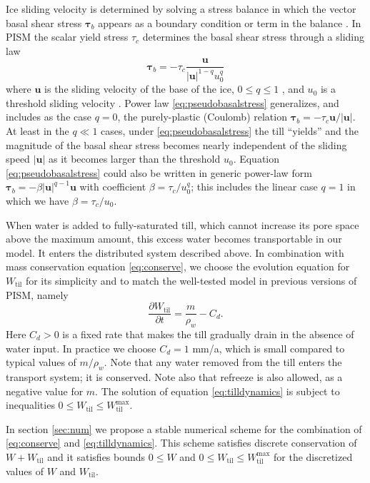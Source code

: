 \documentclass[gmd]{copernicus}   %
\newcommand{\text}{\textrm}
\newcommand{\Wtil}{W_{\text{til}}}
\newcommand{\Wtilmax}{W_{\text{til}}^{\text{max}}}
\begin{document}
Ice sliding velocity is determined by solving a stress balance in which the vector basal shear stress $\boldsymbol\tau_b$ appears as a boundary condition or term in the balance \citep{BBssasliding,SchoofStream,SchoofCoulombBlatter}.  In PISM the scalar yield stress $\tau_c$ determines the basal shear stress through a sliding law
\begin{equation}
\boldsymbol\tau_b = - \tau_c \frac{\mathbf{u}}{|\mathbf{u}|^{1-q} u_0^q} \label{eq:pseudobasalstress}
\end{equation}
where $\mathbf{u}$ is the sliding velocity of the base of the ice, $0\le q \le 1$ , and $u_0$ is a threshold sliding velocity \citep{AschwandenAdalgeirsdottirKhroulev}.  Power law \eqref{eq:pseudobasalstress} generalizes, and includes as the case $q=0$, the purely-plastic (Coulomb) relation $\boldsymbol\tau_b = - \tau_c \mathbf{u}/|\mathbf{u}|$.  At least in the $q\ll 1$ cases, under \eqref{eq:pseudobasalstress} the till ``yields'' and the magnitude of the basal shear stress becomes nearly independent of the sliding speed $|\mathbf{u}|$ as it becomes larger than the threshold $u_0$.  Equation \eqref{eq:pseudobasalstress} could also be written in generic power-law form $\boldsymbol\tau_b = - \beta |\mathbf{u}|^{q-1} \mathbf{u}$ with coefficient $\beta = \tau_c / u_0^q$; this includes the linear case $q=1$ in which we have $\beta = \tau_c/u_0$.

When water is added to fully-saturated till, which cannot increase its pore space above the maximum amount, this excess water becomes transportable in our model.  It enters the distributed system described above.  In combination with mass conservation equation \eqref{eq:conserve}, we choose the evolution equation for $\Wtil$ for  its simplicity and to match the well-tested model in previous versions of PISM, namely
\begin{equation}
\frac{\partial \Wtil}{\partial t} = \frac{m}{\rho_w} - C_d. \label{eq:tilldynamics}
\end{equation}
Here $C_d>0$ is a fixed rate that makes the till gradually drain in the absence of water input.  In practice we choose $C_d=1$ mm/a, which is small compared to typical values of $m/\rho_w$.  Note that any water removed from the till enters the transport system; it is conserved.  Note also that refreeze is also allowed, as a negative value for $m$.  The solution of equation \eqref{eq:tilldynamics} is subject to inequalities $0\le \Wtil \le \Wtilmax$.

In section \ref{sec:num} we propose a stable numerical scheme for the combination of \eqref{eq:conserve} and \eqref{eq:tilldynamics}.  This scheme satisfies discrete conservation of $W+\Wtil$ and it satisfies bounds $0\le W$ and $0\le \Wtil \le \Wtilmax$ for the discretized values of $W$ and $\Wtil$.
\end{document}
